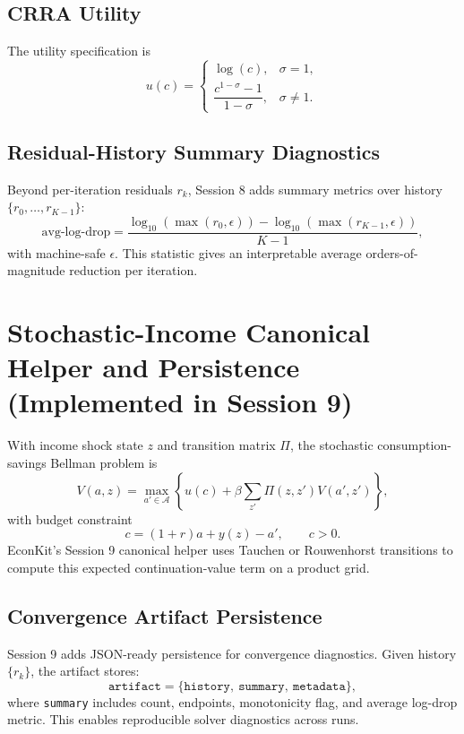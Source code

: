 \documentclass[11pt]{article}
\begin{document}
\subsection{CRRA Utility}
The utility specification is
\begin{equation}
u(c)=
\begin{cases}
\log(c), & \sigma = 1, \\
\dfrac{c^{1-\sigma}-1}{1-\sigma}, & \sigma \neq 1.
\end{cases}
\end{equation}

\subsection{Residual-History Summary Diagnostics}
Beyond per-iteration residuals \(r_k\), Session 8 adds summary metrics over
history \(\{r_0,\dots,r_{K-1}\}\):
\begin{equation}
    \text{avg-log-drop} = \frac{\log_{10}(\max(r_0,\epsilon)) -
    \log_{10}(\max(r_{K-1},\epsilon))}{K-1},
\end{equation}
with machine-safe \(\epsilon\). This statistic gives an interpretable average
orders-of-magnitude reduction per iteration.

\section{Stochastic-Income Canonical Helper and Persistence (Implemented in Session 9)}
With income shock state \(z\) and transition matrix \(\Pi\), the stochastic
consumption-savings Bellman problem is
\begin{equation}
    V(a,z)=\max_{a'\in\mathcal{A}}\left\{u(c)+\beta\sum_{z'}\Pi(z,z')V(a',z')\right\},
\end{equation}
with budget constraint
\begin{equation}
    c=(1+r)a + y(z) - a', \qquad c>0.
\end{equation}
EconKit's Session 9 canonical helper uses Tauchen or Rouwenhorst transitions
to compute this expected continuation-value term on a product grid.

\subsection{Convergence Artifact Persistence}
Session 9 adds JSON-ready persistence for convergence diagnostics. Given history
\(\{r_k\}\), the artifact stores:
\begin{equation}
    \texttt{artifact} = \{\texttt{history},\ \texttt{summary},\ \texttt{metadata}\},
\end{equation}
where \texttt{summary} includes count, endpoints, monotonicity flag, and average
log-drop metric. This enables reproducible solver diagnostics across runs.
\end{document}
